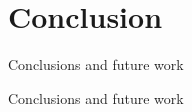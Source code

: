 \documentclass[xcolor=x11names,compress]{beamer}
\begin{document}
\section{Conclusion}

{
\begin{frame}[t]{Conclusions and future work}
    
\end{frame}}

{
\begin{frame}[t]{Conclusions and future work}
    
    
\end{frame}}
\end{document}
